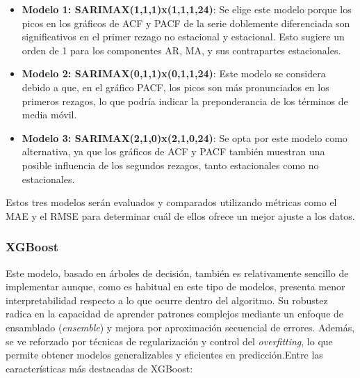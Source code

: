 \begin{itemize}
    \item \textbf{Modelo 1: SARIMAX(1,1,1)x(1,1,1,24)}:
    Se elige este modelo porque los picos en los gráficos de ACF y PACF de la serie doblemente diferenciada son significativos en el primer rezago no estacional y estacional. Esto sugiere un orden de 1 para los componentes AR, MA, y sus contrapartes estacionales.

    \item \textbf{Modelo 2: SARIMAX(0,1,1)x(0,1,1,24)}:
    Este modelo se considera debido a que, en el gráfico PACF, los picos son más pronunciados en los primeros rezagos, lo que podría indicar la preponderancia de los términos de media móvil.

    \item \textbf{Modelo 3: SARIMAX(2,1,0)x(2,1,0,24)}:
    Se opta por este modelo como alternativa, ya que los gráficos de ACF y PACF también muestran una posible influencia de los segundos rezagos, tanto estacionales como no estacionales.
\end{itemize}

Estos tres modelos serán evaluados y comparados utilizando métricas como el MAE y el RMSE para determinar cuál de ellos ofrece un mejor ajuste a los datos.
%
%
%
\subsubsection{XGBoost}
%
%
%
Este modelo, basado en árboles de decisión, también es relativamente sencillo de implementar aunque, como es habitual en este tipo de modelos, presenta menor interpretabilidad respecto a lo que ocurre dentro del algoritmo. Su robustez radica en la capacidad de aprender patrones complejos mediante un enfoque de ensamblado (\textit{ensemble}) y mejora por aproximación secuencial de errores. Además, se ve reforzado por técnicas de regularización y control del \textit{overfitting}, lo que permite obtener modelos generalizables y eficientes en predicción.Entre las características más destacadas de XGBoost:

